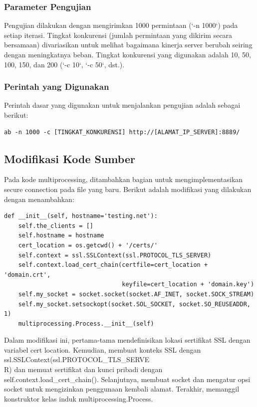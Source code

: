 \documentclass[12pt]{article}
\begin{document}
\subsubsection{Parameter Pengujian}

Pengujian dilakukan dengan mengirimkan 1000 permintaan (`-n 1000`) pada setiap iterasi. Tingkat konkurensi (jumlah permintaan yang dikirim secara bersamaan) divariasikan untuk melihat bagaimana kinerja server berubah seiring dengan meningkatnya beban. Tingkat konkurensi yang digunakan adalah 10, 50, 100, 150, dan 200 (`-c 10`, `-c 50`, dst.).

\subsubsection{Perintah yang Digunakan}

Perintah dasar yang digunakan untuk menjalankan pengujian adalah sebagai berikut:

\begin{verbatim}
ab -n 1000 -c [TINGKAT_KONKURENSI] http://[ALAMAT_IP_SERVER]:8889/
\end{verbatim}

\subsection{Modifikasi Kode Sumber}

Pada kode multiprocessing, ditambahkan bagian untuk mengimplementasikan secure connection pada file yang baru. Berikut adalah modifikasi yang dilakukan dengan menambahkan:

\begin{verbatim}
def __init__(self, hostname='testing.net'):
    self.the_clients = []
    self.hostname = hostname
    cert_location = os.getcwd() + '/certs/'
    self.context = ssl.SSLContext(ssl.PROTOCOL_TLS_SERVER)
    self.context.load_cert_chain(certfile=cert_location + 'domain.crt',
                                 keyfile=cert_location + 'domain.key')
    self.my_socket = socket.socket(socket.AF_INET, socket.SOCK_STREAM)
    self.my_socket.setsockopt(socket.SOL_SOCKET, socket.SO_REUSEADDR, 1)
    multiprocessing.Process.__init__(self)
\end{verbatim}

Dalam modifikasi ini, pertama-tama mendefinisikan lokasi sertifikat SSL dengan variabel cert location. Kemudian, membuat konteks SSL dengan ssl.SSLContext(ssl.PROTOCOL\_TLS\_SERVE\\R) dan memuat sertifikat dan kunci pribadi dengan self.context.load\_cert\_chain(). Selanjutnya, membuat socket dan mengatur opsi socket untuk mengizinkan penggunaan kembali alamat. Terakhir, memanggil konstruktor kelas induk multiprocessing.Process.
\end{document}
